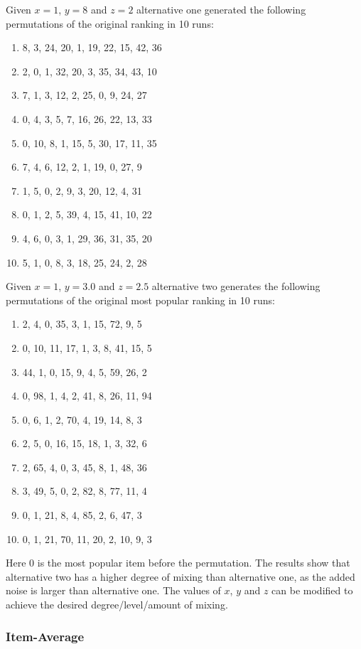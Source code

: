Given $x=1$, $y=8$ and $z=2$ alternative one generated the following permutations of the original ranking in 10 runs:

\begin{enumerate}
	\item 8, 3, 24, 20, 1, 19, 22, 15, 42, 36
	\item 2, 0, 1, 32, 20, 3, 35, 34, 43, 10
	\item 7, 1, 3, 12, 2, 25, 0, 9, 24, 27
	\item 0, 4, 3, 5, 7, 16, 26, 22, 13, 33
	\item 0, 10, 8, 1, 15, 5, 30, 17, 11, 35
	\item 7, 4, 6, 12, 2, 1, 19, 0, 27, 9
	\item 1, 5, 0, 2, 9, 3, 20, 12, 4, 31
	\item 0, 1, 2, 5, 39, 4, 15, 41, 10, 22
	\item 4, 6, 0, 3, 1, 29, 36, 31, 35, 20
	\item 5, 1, 0, 8, 3, 18, 25, 24, 2, 28
\end{enumerate}

Given $x=1$, $y=3.0$ and $z=2.5$ alternative two generates the following permutations of the original most popular ranking in 10 runs:

\begin{enumerate}
	\item 2, 4, 0, 35, 3, 1, 15, 72, 9, 5
	\item 0, 10, 11, 17, 1, 3, 8, 41, 15, 5
	\item 44, 1, 0, 15, 9, 4, 5, 59, 26, 2
	\item 0, 98, 1, 4, 2, 41, 8, 26, 11, 94
	\item 0, 6, 1, 2, 70, 4, 19, 14, 8, 3
	\item 2, 5, 0, 16, 15, 18, 1, 3, 32, 6
	\item 2, 65, 4, 0, 3, 45, 8, 1, 48, 36
	\item 3, 49, 5, 0, 2, 82, 8, 77, 11, 4
	\item 0, 1, 21, 8, 4, 85, 2, 6, 47, 3
	\item 0, 1, 21, 70, 11, 20, 2, 10, 9, 3
\end{enumerate}

Here 0 is the most popular item before the permutation. The results show that alternative two has a higher degree of mixing than alternative one, as the added noise is larger than alternative one. The values of $x$, $y$ and $z$ can be modified to achieve the desired degree/level/amount of mixing.

\subsubsection{Item-Average}

